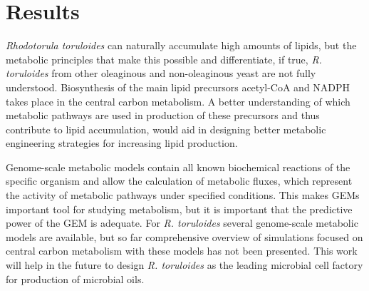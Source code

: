 \chapter{Results}





\textit{Rhodotorula toruloides} can naturally accumulate high amounts of lipids, but the 
metabolic principles that make this possible and differentiate, if true, \textit{R. toruloides} from other oleaginous and non-oleaginous yeast are not fully understood.
Biosynthesis of the main lipid precursors acetyl-CoA and NADPH takes place in the central carbon metabolism. A better understanding of which 
metabolic pathways are used in production of these precursors and thus contribute to lipid accumulation, would aid in designing better 
metabolic engineering strategies for increasing lipid production.

Genome-scale metabolic models contain all known biochemical reactions of the specific organism and allow the calculation of
metabolic fluxes, which represent the activity of metabolic pathways under specified conditions. 
This makes GEMs important tool for studying metabolism, but it is important that the predictive power of the GEM is
adequate. For \textit{R. toruloides} several genome-scale metabolic models are available, but so far comprehensive overview of 
simulations focused on central carbon metabolism with these models has not been presented.
This work will help in the future to design \textit{R. toruloides} as the leading microbial cell factory for production of microbial oils.









